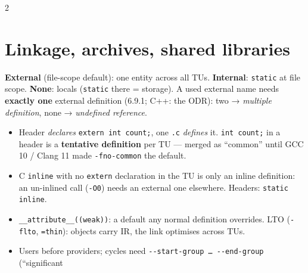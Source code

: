 \documentclass[8pt]{extarticle}
\newcommand\ct[1]{\texttt{#1}}
\begin{document}
\begin{multicols}{2}
\section{Linkage, archives, shared libraries}
\textbf{External} (file-scope default): one entity across all TUs. \textbf{Internal}: \ct{static}
at file scope. \textbf{None}: locals (\ct{static} there = storage). A used external name needs
\textbf{exactly one} external definition (6.9.1; C++: the ODR): two → \emph{multiple
definition}, none → \emph{undefined reference}.
\begin{itemize}
  \item Header \emph{declares} \ct{extern int count;}, one \ct{.c} \emph{defines} it.
        \ct{int count;} in a header is a \textbf{tentative definition} per TU — merged as
        ``common'' until GCC 10 / Clang 11 made \ct{-fno-common} the default.
  \item C \ct{inline} with no \ct{extern} declaration in the TU is only an inline definition:
        an un-inlined call (\ct{-O0}) needs an external one elsewhere. Headers: \ct{static inline}.
  \item \ct{\_\_attribute\_\_((weak))}: a default any normal definition overrides. LTO
        (\ct{-flto}, \ct{=thin}): objects carry IR, the link optimises across TUs.
\end{itemize}
\vspace{1pt}
\begin{itemize}
  \item Users before providers; cycles need \ct{-{}-start-group … -{}-end-group} (``significant

\end{itemize}
\end{multicols}
\end{document}
